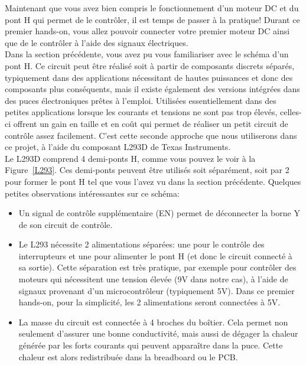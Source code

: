 Maintenant que vous avez bien compris le fonctionnement d'un moteur DC et du pont H qui permet de le contrôler, il est temps de passer à la pratique! Durant ce premier hands-on, vous allez pouvoir connecter votre premier moteur DC ainsi que de le contrôler à l'aide des signaux électriques.\\

Dans la section précédente, vous avez pu vous familiariser avec le schéma d'un pont H. Ce circuit peut être réalisé soit à partir de composants discrets séparés, typiquement dans des applications nécessitant de hautes puissances et donc des composants plus conséquents, mais il existe également des versions intégrées dans des puces électroniques prêtes à l'emploi. Utilisées essentiellement dans des petites applications lorsque les courants et tensions ne sont pas trop élevés, celles-ci offrent un gain en taille et en coût qui permet de réaliser un petit circuit de contrôle assez facilement. C'est cette seconde approche que nous utiliserons dans ce projet, à l'aide du composant L293D de Texas Instruments.\\

Le L293D comprend 4 demi-ponts H, comme vous pouvez le voir à la Figure~\ref{L293}. Ces demi-ponts peuvent être utilisés soit séparément, soit par 2 pour former le pont H tel que vous l'avez vu dans la section précédente. Quelques petites observations intéressantes sur ce schéma:
\begin{itemize}
\item Un signal de contrôle supplémentaire (EN) permet de déconnecter la borne Y de son circuit de contrôle.
\item Le L293 nécessite 2 alimentations séparées: une pour le contrôle des interrupteurs et une pour alimenter le pont H (et donc le circuit connecté à sa sortie). Cette séparation est très pratique, par exemple pour contrôler des moteurs qui nécessitent une tension élevée (9V dans notre cas), à l'aide de signaux provenant d'un microcontrôleur (typiquement 5V). Dans ce premier hands-on, pour la simplicité, les 2 alimentations seront connectées à 5V.
\item La masse du circuit est connectée à 4 broches du boîtier. Cela permet non seulement d'assurer une bonne conductivité, mais aussi de dégager la chaleur générée par les forts courants qui peuvent apparaître dans la puce. Cette chaleur est alors redistribuée dans la breadboard ou le PCB.\\
\end{itemize}

